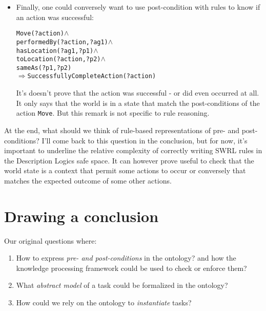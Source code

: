 \begin{itemize}
And even if we can \emph{add} somehow new statements, we can not \emph{remove}
statement because of the monotonic paradigm of OWL\footnote{About monotonicity
and non-monotonicity, cf Wikipedia:
\url{http://en.wikipedia.org/wiki/Monotonicity_of_entailment}. About
non-monotonic reasoning, cf also
\url{http://www.aaai.org/AITopics/pmwiki/pmwiki.php/AITopics/Nonmonotonicity}}.
It's not possible for instance to complete the post-condition rule to say that
the agent is not anymore in {\tt p1}.


\item  Finally, one could conversely want to use post-condition with rules to
know if an action was successful:


\begin{alltt}

Move(?action) \(\land\)
performedBy(?action, ?ag1) \(\land\)
hasLocation(?ag1, ?p1) \(\land\)
toLocation(?action, ?p2) \(\land\)
sameAs(?p1, ?p2)
\(\Rightarrow\) SuccessfullyCompleteAction(?action)

\end{alltt}

It's doesn't prove that the action was successful - or did even occurred at
all. It only says that the world is in a state that match the post-conditions
of the action {\tt Move}. But this remark is not specific to rule reasoning.

\end{itemize}

At the end, what should we think of rule-based representations of pre- and
post-conditions? I'll come back to this question in the conclusion, but for
now, it's important to underline the relative complexity of correctly writing
SWRL rules in the Description Logics safe space. It can however prove useful to
check that the world state is a context that permit some actions to occur or
conversely that matches the expected outcome of some other actions.


\section{Drawing a conclusion}

Our original questions where:

\begin{enumerate}

\item  How to express \emph{pre- and post-conditions} in the ontology? and how
the knowledge processing framework could be used to check or enforce them?

\item  What \emph{abstract model} of a task could be formalized in the
ontology?

\item  How could we rely on the ontology to \emph{instantiate} tasks?

\end{enumerate}

